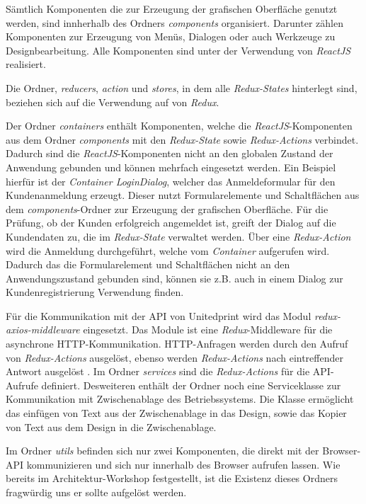 Sämtlich Komponenten die zur Erzeugung der grafischen Oberfläche genutzt werden, sind innherhalb des Ordners \textit{components} organisiert. Darunter zählen Komponenten zur Erzeugung von Menüs, Dialogen oder auch Werkzeuge zu Designbearbeitung. Alle Komponenten sind unter der Verwendung von \textit{ReactJS} realisiert.

Die Ordner, \textit{reducers}, \textit{action} und \textit{stores}, in dem alle \textit{Redux-States} hinterlegt sind, beziehen sich auf die Verwendung auf von \textit{Redux}. 

Der Ordner \textit{containers} enthält Komponenten, welche die \textit{ReactJS}-Komponenten aus dem Ordner \textit{components} mit den \textit{Redux-State} sowie \textit{Redux-Actions} verbindet. 
Dadurch sind die \textit{ReactJS}-Komponenten nicht an den globalen Zustand der Anwendung gebunden und können mehrfach eingesetzt werden. Ein Beispiel hierfür ist der \textit{Container LoginDialog}, welcher das Anmeldeformular für den Kundenanmeldung erzeugt. Dieser nutzt Formularelemente und Schaltflächen aus dem \textit{components}-Ordner zur Erzeugung der grafischen Oberfläche. Für die Prüfung, ob der Kunden erfolgreich angemeldet ist, greift der Dialog auf die Kundendaten zu, die im \textit{Redux-State} verwaltet werden. Über eine \textit{Redux-Action} wird die Anmeldung durchgeführt, welche vom \textit{Container} aufgerufen wird. Dadurch das die Formularelement und Schaltflächen nicht an den Anwendungszustand gebunden sind, können sie z.B. auch in einem Dialog zur Kundenregistrierung Verwendung finden.

Für die Kommunikation mit der API von Unitedprint wird das Modul \textit{redux-axios-middleware} eingesetzt. 
Das Module ist eine \textit{Redux}-Middleware für die asynchrone HTTP-Kommunikation. HTTP-Anfragen werden durch den Aufruf von \textit{Redux-Actions} ausgelöst, ebenso werden \textit{Redux-Actions} nach eintreffender Antwort ausgelöst \autocite[vgl.][]{ReduxAxios}. Im Ordner \textit{services} sind die \textit{Redux-Actions} für die API-Aufrufe definiert. Desweiteren enthält der Ordner noch eine Serviceklasse zur Kommunikation mit Zwischenablage des Betriebssystems. Die Klasse ermöglicht das einfügen von Text aus der Zwischenablage in das Design, sowie das Kopier von Text aus dem Design in die Zwischenablage.

Im Ordner \textit{utils} befinden sich nur zwei Komponenten, die direkt mit der Browser-API kommunizieren und sich nur innerhalb des Browser aufrufen lassen. Wie bereits im Architektur-Workshop festgestellt, ist die Existenz dieses Ordners fragwürdig uns er sollte aufgelöst werden.

